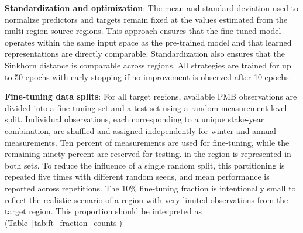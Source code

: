 \documentclass[draft]{agujournal2019}
\begin{document}
\textbf{Standardization and optimization}: The mean and standard deviation used to normalize predictors and targets remain fixed at the values estimated from the multi-region source regions. This approach ensures that the fine-tuned model operates within the same input space as the pre-trained model and that learned representations are directly comparable. Standardization also ensures that the Sinkhorn distance is comparable across regions. All strategies are trained for up to 50 epochs with early stopping if no improvement is observed after 10 epochs.

\textbf{Fine-tuning data splits}: For all target regions, available PMB observations are divided into a fine-tuning set and a test set using a random measurement-level split. Individual observations, each corresponding to a unique stake-year combination, are shuffled and assigned independently for winter and annual measurements. Ten percent of measurements are used for fine-tuning, while the remaining ninety percent are reserved for testing.  in the region is represented in both sets. To reduce the influence of a single random split, this partitioning is repeated five times with different random seeds, and mean performance is reported across repetitions. The 10\% fine-tuning fraction is intentionally small to reflect the realistic scenario of a region with very limited observations from the target region. This proportion should be interpreted as   (Table~\ref{tab:ft_fraction_counts})


 
\end{document}
